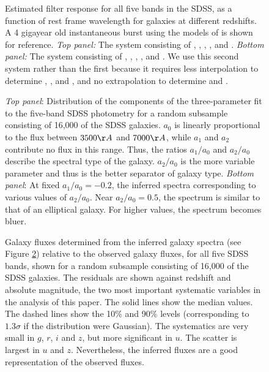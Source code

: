 \clearpage

\setcounter{thefigs}{0}

\clearpage
{}
\begin{figure}
\figurenum{\fignum}
\caption{\label{response_sdss} Estimated filter response for all five
bands in the SDSS, as a function of rest frame wavelength for galaxies
at different redshifts. A 4 gigayear old instantaneous burst using the
models of \citet{bruzual93a} is shown for reference. {\it Top panel:}
The system consisting of , , ,
, and .  {\it Bottom panel:} The system
consisting of , , ,
, and . We use this second system rather
than the first because it requires less interpolation to determine
, , and , and no extrapolation to
determine  and . }
\end{figure}

\clearpage
{}
\begin{figure}
\figurenum{\fignum}
\caption{\label{plotaij.sample8b15} {\it Top panel}: Distribution of
the components of the three-parameter fit to the five-band SDSS
photometry for a random subsample consisting of 16,000 of the SDSS
galaxies. $a_0$ is linearly proportional to the flux between $3500\AA$
and $7000\AA$, while $a_1$ and $a_2$ contribute no flux in this
range. Thus, the ratios $a_1/a_0$ and $a_2/a_0$ describe the spectral
type of the galaxy. $a_2/a_0$ is the more variable parameter and thus
is the better separator of galaxy type. {\it Bottom panel}: At fixed
$a_1/a_0=-0.2$, the inferred spectra corresponding to various values
of $a_2/a_0$. Near $a_2/a_0=0.5$, the spectrum is similar to that of
an elliptical galaxy. For higher values, the spectrum becomes bluer. }
\end{figure}

\clearpage
{}
\begin{figure}
\figurenum{\fignum}
\caption{\label{model} Galaxy fluxes determined from the inferred
galaxy spectra (see Figure \ref{plotaij.sample8b15}) relative to the
observed galaxy fluxes, for all five SDSS bands, shown for a random
subsample consisting of 16,000 of the SDSS galaxies. The
residuals are shown against redshift and absolute magnitude, the two
most important systematic variables in the analysis of this paper. The
solid lines show the median values. The dashed lines show the 10\% and
90\% levels (corresponding to $1.3\sigma$ if the distribution were
Gaussian). The systematics are very small in $g$, $r$, $i$ and $z$,
but more significant in $u$. The scatter is largest in $u$ and
$z$. Nevertheless, the inferred fluxes are a good representation of
the observed fluxes.  }
\end{figure}

